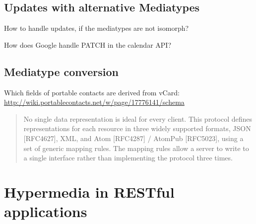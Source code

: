 \documentclass[12pt,a4paper]{scrartcl}		%
\begin{document}
\subsection{Updates with alternative Mediatypes}
How to handle updates, if the mediatypes are not isomorph?

How does Google handle PATCH in the calendar API?

\subsection{Mediatype conversion}

Which fields of portable contacts are derived from vCard: \url{http://wiki.portablecontacts.net/w/page/17776141/schema}

\begin{quote}
  No single data representation is ideal for every client. This protocol defines representations for each resource in three widely supported formats, JSON [RFC4627], XML, and Atom [RFC4287] / AtomPub [RFC5023], using a set of generic mapping rules. The mapping rules allow a server to write to a single interface rather than implementing the protocol three times.
\end{quote}\cite[Core API Server]{OSSpec2.0.1}

\section{Hypermedia in RESTful applications}




\end{document}
